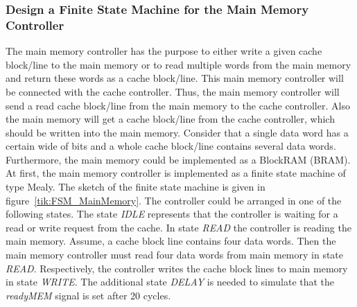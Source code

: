 \subsubsection{Design a Finite State Machine for the Main Memory Controller}
The main memory controller has the purpose to either write a given cache block/line to the main memory or to read multiple words from the main memory and return these words as a cache block/line. This main memory controller will be connected with the cache controller. Thus, the main memory controller will send a read cache block/line from the main memory to the cache controller. Also the main memory will get a cache block/line from the cache controller, which should be written into the main memory. Consider that a single data word has a certain wide of bits and a whole cache block/line contains several data words. Furthermore, the main memory could be implemented as a BlockRAM (BRAM). At first, the main memory controller is implemented as a finite state machine of type Mealy. The sketch of the finite state machine is given in figure~\ref{tik:FSM_MainMemory}.
The controller could be arranged in one of the following states. The state \textit{IDLE} represents that the controller is waiting for a read or write request from the cache. In state \textit{READ} the controller is reading the main memory. Assume, a cache block line contains four data words. Then the main memory controller must read four data words from main memory in state \textit{READ}. Respectively, the controller writes the cache block lines to main memory in state \textit{WRITE}. The additional state \textit{DELAY} is needed to simulate that the \textit{readyMEM} signal is set after 20 cycles.


